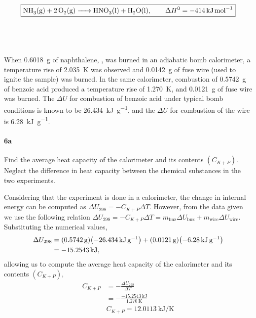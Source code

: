 \documentclass[main.tex]{subfiles}
\begin{document}
\begin{gather*}
    \boxed{\ce{NH3(g) + 2O2(g) -> HNO3(l) + H2O(l)},\qquad \Delta H^0 =-\SI{414}{\kilo\joule\per\mole}}
\end{gather*}



\subsection{~}


When \SI{0.6018}{\gram} of naphthalene, , was burned in an adiabatic bomb calorimeter, a temperature rise of \SI{2.035}{\kelvin} was observed and \SI{0.0142}{\gram} of fuse wire (used to ignite the sample) was burned.
In the same calorimeter, combustion of \SI{0.5742}{\gram} of benzoic acid produced a temperature rise of \SI{1.270}{\kelvin}, and \SI{0.0121}{\gram} of fuse wire was burned.
The $\Delta U$ for combustion of benzoic acid under typical bomb conditions is known to be \SI{26.434}{\kilo\joule\per\gram}, and the $\Delta U$ for combustion of the wire is \SI{6.28}{\kilo\joule\per\gram}. 

\paragraph{6a} Find the average heat capacity of the calorimeter and its contents $(C_{K+P})$.
Neglect the difference in heat capacity between the chemical substances in the two experiments.

Considering that the experiment is done in a calorimeter, the change in internal energy can be computed as $\Delta U_{298} = -C_{K+P}\Delta T$.
However, from the data given we use the following relation $\Delta U_{298} = -C_{K+P}\Delta T = m_{\mathrm{bnz}}\Delta U_{\mathrm{bnz}} + m_{\mathrm{wire}} \Delta U_{\mathrm{wire}}$.
Substituting the numerical values,
\begin{align*}
    \Delta U_{298} &= \qty(\SI{0.5742}{\gram})\qty(-\SI{26.434}{\kilo\joule\per\gram}) + \qty(\SI{0.0121}{\gram})\qty(-\SI{6.28}{\kilo\joule\per\gram}) \\
    &=-\SI{15.2543}{\kilo\joule},
\end{align*}
allowing us to compute the average heat capacity of the calorimeter and its contents $(C_{K+P})$,
\begin{align*}
    C_{K+P} &= -\frac{\Delta U_{298}}{\Delta T} \\
    &=-\frac{-\SI{15.2543}{\kilo\joule}}{\SI{1.270}{\kelvin}} \\
    &\boxed{C_{K+P}=\SI[per-mode=fraction]{12.0113}{\kilo\joule\per\kelvin}}
\end{align*}
\end{document}
